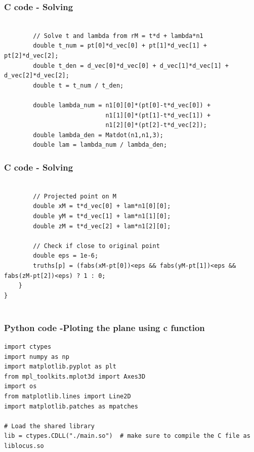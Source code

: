 \documentclass{beamer}
\begin{document}
\begin{frame}[fragile]                            
\frametitle{C code - Solving}                
\begin{lstlisting}

        // Solve t and lambda from rM = t*d + lambda*n1
        double t_num = pt[0]*d_vec[0] + pt[1]*d_vec[1] + pt[2]*d_vec[2];
        double t_den = d_vec[0]*d_vec[0] + d_vec[1]*d_vec[1] + d_vec[2]*d_vec[2];
        double t = t_num / t_den;

        double lambda_num = n1[0][0]*(pt[0]-t*d_vec[0]) +
                            n1[1][0]*(pt[1]-t*d_vec[1]) +
                            n1[2][0]*(pt[2]-t*d_vec[2]);
        double lambda_den = Matdot(n1,n1,3);
        double lam = lambda_num / lambda_den;
\end{lstlisting}
\end{frame}
\begin{frame}[fragile]                            
\frametitle{C code - Solving}                
\begin{lstlisting}

        // Projected point on M
        double xM = t*d_vec[0] + lam*n1[0][0];
        double yM = t*d_vec[1] + lam*n1[1][0];
        double zM = t*d_vec[2] + lam*n1[2][0];

        // Check if close to original point
        double eps = 1e-6;
        truths[p] = (fabs(xM-pt[0])<eps && fabs(yM-pt[1])<eps && fabs(zM-pt[2])<eps) ? 1 : 0;
    }
}


\end{lstlisting}
\end{frame}

	
\begin{frame}[fragile]                              
	\frametitle{Python code -Ploting the plane using c function} 
	\begin{lstlisting}
import ctypes
import numpy as np
import matplotlib.pyplot as plt
from mpl_toolkits.mplot3d import Axes3D
import os
from matplotlib.lines import Line2D
import matplotlib.patches as mpatches

# Load the shared library
lib = ctypes.CDLL("./main.so")  # make sure to compile the C file as liblocus.so
\end{lstlisting}
\end{frame}
\end{document}
